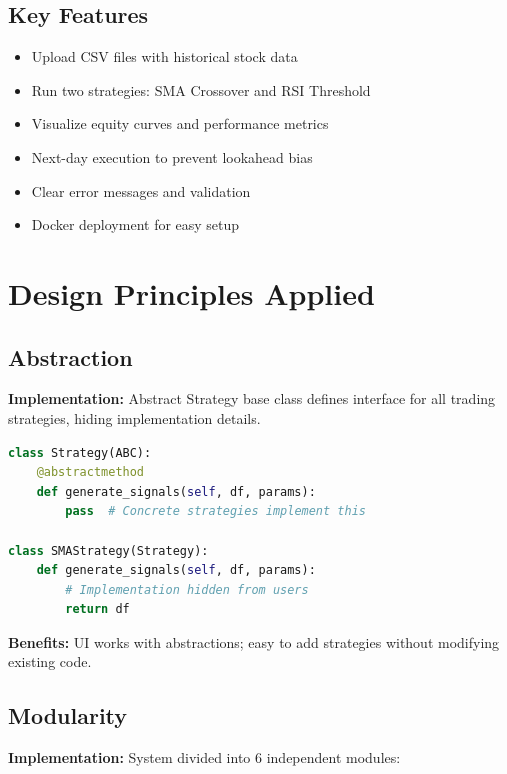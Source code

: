 \documentclass[11pt,a4paper]{article}
\begin{document}
\subsection{Key Features}
\begin{itemize}[leftmargin=*, itemsep=0pt]
    \item Upload CSV files with historical stock data
    \item Run two strategies: SMA Crossover and RSI Threshold
    \item Visualize equity curves and performance metrics
    \item Next-day execution to prevent lookahead bias
    \item Clear error messages and validation
    \item Docker deployment for easy setup
\end{itemize}

\section{Design Principles Applied}

\subsection{Abstraction}
\textbf{Implementation:} Abstract Strategy base class defines interface for all trading strategies, hiding implementation details.

\begin{lstlisting}[language=Python]
class Strategy(ABC):
    @abstractmethod
    def generate_signals(self, df, params):
        pass  # Concrete strategies implement this

class SMAStrategy(Strategy):
    def generate_signals(self, df, params):
        # Implementation hidden from users
        return df
\end{lstlisting}

\textbf{Benefits:} UI works with abstractions; easy to add strategies without modifying existing code.

\subsection{Modularity}
\textbf{Implementation:} System divided into 6 independent modules:
\end{document}
